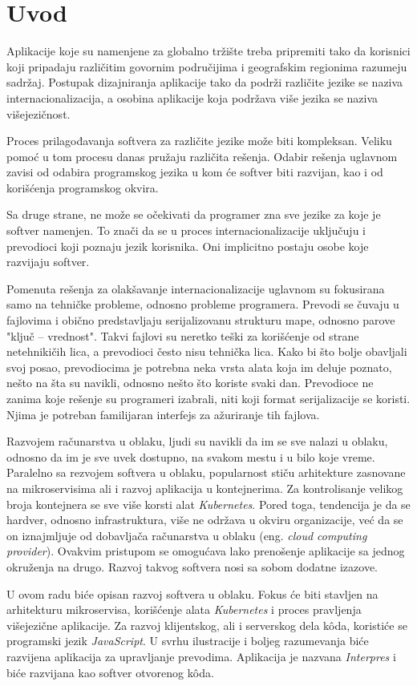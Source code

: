 \chapter{Uvod}\label{ch:uvod}

Aplikacije koje su namenjene za globalno tržište treba pripremiti 
tako da korisnici koji pripadaju različitim govornim područijima i 
geografskim regionima razumeju sadržaj. Postupak dizajniranja aplikacije 
tako da podrži različite jezike se naziva internacionalizacija, a osobina 
aplikacije koja podržava više jezika se naziva višejezičnost. 

Proces prilagođavanja softvera za različite jezike može biti kompleksan. 
Veliku pomoć u tom procesu danas pružaju različita rešenja. Odabir rešenja 
uglavnom zavisi od odabira programskog jezika u kom će softver biti 
razvijan, kao i od korišćenja programskog okvira.

Sa druge strane, ne može se očekivati da programer zna sve jezike za koje je 
softver namenjen. To znači da se u proces internacionalizacije uključuju i 
prevodioci koji poznaju jezik korisnika. Oni implicitno 
postaju osobe koje razvijaju softver.

Pomenuta rešenja za olakšavanje internacionalizacije uglavnom su fokusirana
samo na tehničke probleme, odnosno probleme programera. Prevodi se čuvaju u
fajlovima i obično predstavljaju serijalizovanu strukturu mape, odnosno parove
"ključ -- vrednost". Takvi fajlovi su neretko teški za korišćenje od strane
netehnikičih lica, a prevodioci često nisu tehnička lica. Kako bi što bolje 
obavljali svoj posao, prevodiocima je potrebna neka vrsta alata koja im deluje
poznato, nešto na šta su navikli, odnosno nešto što koriste svaki dan. 
Prevodioce ne zanima koje rešenje su programeri izabrali, niti koji format 
serijalizacije se koristi. Njima je potreban familijaran interfejs za ažuriranje
tih fajlova.

Razvojem računarstva u oblaku, ljudi su navikli da im se sve nalazi u oblaku, 
odnosno da im je sve uvek dostupno, na svakom mestu i u bilo koje vreme. 
Paralelno sa rezvojem softvera u oblaku, popularnost stiču arhitekture zasnovane
na mikroservisima ali i razvoj aplikacija u kontejnerima. Za kontrolisanje 
velikog broja kontejnera se sve više korsti alat \textit{Kubernetes}. Pored toga, 
tendencija je da se hardver, odnosno infrastruktura, više ne održava u okviru
organizacije, već da se on iznajmljuje od dobavljača računarstva u oblaku 
(eng. \textit{cloud computing provider}). Ovakvim pristupom se omogućava lako 
prenošenje aplikacije sa jednog okruženja na drugo. Razvoj takvog softvera nosi
sa sobom dodatne izazove. 

U ovom radu biće opisan razvoj softvera u oblaku. Fokus će biti stavljen na 
arhitekturu mikroservisa, korišćenje alata \textit{Kubernetes} i proces pravljenja 
višejezične aplikacije. Za razvoj klijentskog, ali i serverskog dela 
kôda, koristiće se programski jezik \textit{JavaScript}. U svrhu ilustracije i
boljeg razumevanja biće razvijena aplikacija za upravljanje prevodima. 
Aplikacija je nazvana \textit{Interpres} i biće razvijana kao softver otvorenog kôda.
